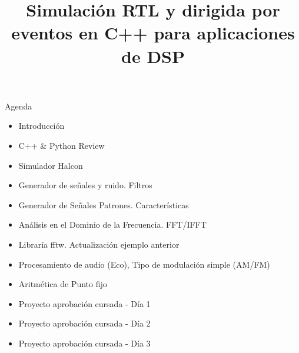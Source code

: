 \documentclass[11pt]{beamer}
\title{Simulación RTL y dirigida por eventos en C++ para aplicaciones de DSP}
\institute[]{Instituto Balseiro \par Centro Atómico Bariloche}
\date{}
\begin{document}
	
	\begin{frame}
		\titlepage
	\end{frame}
	
	\begin{frame}{Agenda}
		\begin{itemize}
			\item Introducción
			\item C++ \& Python Review
			\item Simulador Halcon
			\item Generador de señales y ruido. Filtros
			\item Generador de Señales Patrones. Características
			\item Análisis en el Dominio de la Frecuencia. FFT/IFFT
			\item Libraría fftw. Actualización ejemplo anterior
			\item Procesamiento de audio (Eco), Tipo de modulación simple  (AM/FM)
			\item Aritmética de Punto fijo
			\item Proyecto aprobación cursada - Día 1
			\item Proyecto aprobación cursada - Día 2
			\item Proyecto aprobación cursada - Día 3
	\end{itemize}
	\end{frame}
	
\end{document}
